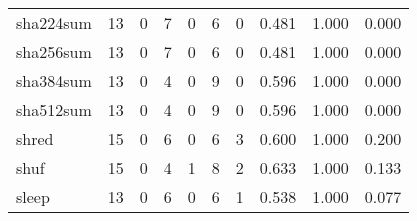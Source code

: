 \begin{longtable}{lp{2.0cm}p{2.0cm}p{2.0cm}p{2.0cm}p{2.0cm}p{2.0cm}p{2.0cm}p{2.0cm}p{2.0cm}}
sha224sum &                     13 &                                             0 &                                            7 &                                           0 &                                            6 &                                          0 &                                0.481 &                                  1.000 &                                0.000 \\
sha256sum &                     13 &                                             0 &                                            7 &                                           0 &                                            6 &                                          0 &                                0.481 &                                  1.000 &                                0.000 \\
sha384sum &                     13 &                                             0 &                                            4 &                                           0 &                                            9 &                                          0 &                                0.596 &                                  1.000 &                                0.000 \\
sha512sum &                     13 &                                             0 &                                            4 &                                           0 &                                            9 &                                          0 &                                0.596 &                                  1.000 &                                0.000 \\
shred     &                     15 &                                             0 &                                            6 &                                           0 &                                            6 &                                          3 &                                0.600 &                                  1.000 &                                0.200 \\
shuf      &                     15 &                                             0 &                                            4 &                                           1 &                                            8 &                                          2 &                                0.633 &                                  1.000 &                                0.133 \\
sleep     &                     13 &                                             0 &                                            6 &                                           0 &                                            6 &                                          1 &                                0.538 &                                  1.000 &                                0.077 \\

\end{longtable}
